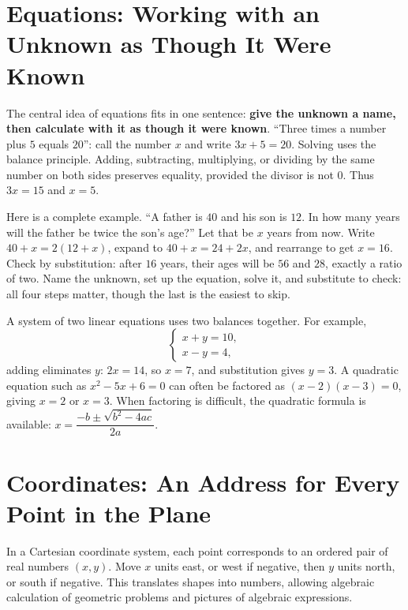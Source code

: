 \section{Equations: Working with an Unknown as Though It Were Known}

The central idea of equations fits in one sentence: \textbf{give the unknown a name, then calculate with it as though it were known}. ``Three times a number plus $5$ equals $20$'': call the number $x$ and write $3x+5=20$. Solving uses the balance principle. Adding, subtracting, multiplying, or dividing by the same number on both sides preserves equality, provided the divisor is not $0$. Thus $3x=15$ and $x=5$.

Here is a complete example. ``A father is $40$ and his son is $12$. In how many years will the father be twice the son's age?'' Let that be $x$ years from now. Write $40+x=2(12+x)$, expand to $40+x=24+2x$, and rearrange to get $x=16$. Check by substitution: after $16$ years, their ages will be $56$ and $28$, exactly a ratio of two. Name the unknown, set up the equation, solve it, and substitute to check: all four steps matter, though the last is the easiest to skip.

A system of two linear equations uses two balances together. For example,
\[\begin{cases}x+y=10,\\ x-y=4,\end{cases}\]
adding eliminates $y$: $2x=14$, so $x=7$, and substitution gives $y=3$. A quadratic equation such as $x^2-5x+6=0$ can often be factored as $(x-2)(x-3)=0$, giving $x=2$ or $x=3$. When factoring is difficult, the quadratic formula is available: $x=\dfrac{-b\pm\sqrt{b^2-4ac}}{2a}$.

\section{Coordinates: An Address for Every Point in the Plane}

In a Cartesian coordinate system, each point corresponds to an ordered pair of real numbers $(x,y)$. Move $x$ units east, or west if negative, then $y$ units north, or south if negative. This translates shapes into numbers, allowing algebraic calculation of geometric problems and pictures of algebraic expressions.

\begin{center}
\end{center}

